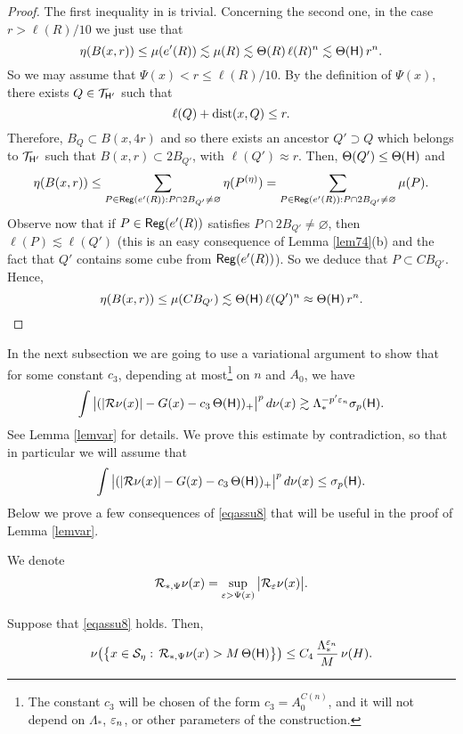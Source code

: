 \begin{proof}
The first inequality in  is trivial. Concerning the second one,
in the case $r>\ell(R)/10$ we just use that
$$\eta(B(x,r))\leq \mu(e'(R))\lesssim\mu(R)\lesssim \Theta(R)\,\ell(R)^n\lesssim \Theta({\mathsf{H}})\,r^n.$$
So we may assume that $\Psi(x)<r\leq \ell(R)/10$.
By the definition of $\Psi(x)$, there exists $Q\in{\mathcal T}_{{\mathsf{H}}'}$ such that
$$\ell(Q) + {\rm dist}(x,Q)\leq r.$$
Therefore, $B_Q\subset B(x,4r)$ and so there exists an ancestor $Q'\supset Q$ which belongs to ${\mathcal T}_{{\mathsf{H}}'}$ such that $B(x,r)\subset  2B_{Q'}$, with $\ell(Q')\approx r$. 
Then, $\Theta(Q')\leq \Theta({\mathsf{H}})$ and
$$\eta(B(x,r))\leq \sum_{P\in{\mathsf{Reg}}(e'(R)):P\cap 2B_{Q'}\neq\varnothing} \eta(P^{(\eta)}) = \sum_{P\in{\mathsf{Reg}}(e'(R)):P\cap 2B_{Q'}\neq\varnothing} \mu(P).
$$
Observe now that if $P\in{\mathsf{Reg}}(e'(R))$ satisfies $P\cap 2B_{Q'}\neq\varnothing$, then $\ell(P)\lesssim \ell(Q')$ (this is an easy consequence of Lemma \ref{lem74}(b) and the fact that $Q'$ contains some cube from ${\mathsf{Reg}}(e'(R))$). So we deduce that
$P\subset CB_{Q'}$. Hence,
$$\eta(B(x,r))\leq \mu(CB_{Q'}) \lesssim \Theta({\mathsf{H}})\,\ell(Q')^n \approx \Theta({\mathsf{H}})\,r^n.$$
\end{proof}

\vv

In the next subsection we are going to use a variational argument to show that for some constant $c_3$, depending at most\footnote{The constant $c_3$
	will be chosen of the form $c_3=A_0^{C(n)}$, and it will not depend on $\Lambda_*$, ${\varepsilon}_n$, or other
	parameters of the construction.} on $n$ and $A_0$, we have
$$\int \big|(|{\mathcal R}\nu(x)| - G(x)- c_3\,\Theta({\mathsf{H}}))_+\big|^p\,d\nu(x) \gtrsim \Lambda_*^{-p'{\varepsilon}_n}\sigma_p({\mathsf{H}}).$$
See Lemma \ref{lemvar} for details. We prove this estimate by contradiction, so that in particular we will assume that
\begin{equation}\label{eqassu8}
\int \big|(|{\mathcal R}\nu(x)| - G(x)- c_3\,\Theta({\mathsf{H}}))_+\big|^p\,d\nu(x) \leq \sigma_p({\mathsf{H}}).
\end{equation}
Below we prove a few consequences of \eqref{eqassu8} that will be useful in the proof of Lemma \ref{lemvar}.

We denote
$${\mathcal R}_{*,\Psi}\nu(x) = \sup_{{\varepsilon}>\Psi(x)} \big|{\mathcal R}_{\varepsilon}\nu(x)\big|.$$

\begin{lemma}\label{lemrieszpetit}
Suppose that \eqref{eqassu8} holds. Then,
\begin{equation}\label{eqassu9}
\nu\big(\big\{x\in {\mathcal S}_\eta:\,{\mathcal R}_{*,\Psi}\nu(x) > M\,\Theta({\mathsf{H}})\big\}\big) \leq C_4\, 
\frac{\Lambda_*^{{\varepsilon}_n}}{M} \,\nu(H).
\end{equation}
\end{lemma}

